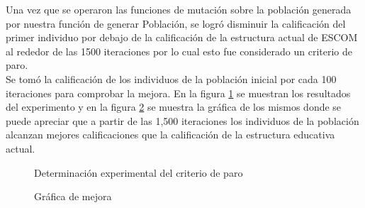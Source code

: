 Una vez que se operaron las funciones de mutación sobre la población generada por nuestra función de generar Población, se logró disminuir la calificación del primer individuo por debajo de la calificación de la estructura actual de ESCOM al rededor de las 1500 iteraciones por lo cual esto fue considerado un criterio de paro.\\


Se tomó la calificación de los individuos de la población inicial por cada 100 iteraciones para comprobar la mejora. En la figura \ref{fig:PruebaV4} se muestran los resultados del experimento y en la figura \ref{fig:grafV4} se muestra la gráfica de los mismos donde se puede apreciar que a partir de las 1,500 iteraciones los individuos de la población alcanzan mejores calificaciones que la calificación de la estructura educativa actual.\\
 
 \begin{figure}[htbp!]
 	\begin{center}
 		\caption{Determinación experimental del criterio de paro}
 		\label{fig:PruebaV4}
 	\end{center}
 \end{figure}


\begin{figure}[htbp!]
	\begin{center}
		\caption{Gráfica de mejora}
		\label{fig:grafV4}
	\end{center}
\end{figure}

